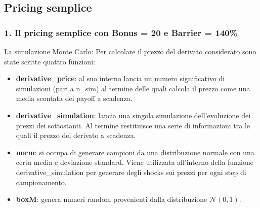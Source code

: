 \subsection[Pricing semplice]{Pricing semplice}
\begin{frame}
	\frametitle{1. Il pricing semplice con Bonus = 20 e Barrier = 140\%}

	\begin{block}{La simulazione Monte Carlo:}
		Per calcolare il prezzo del derivato considerato sono state scritte quattro funzioni:
		\begin{itemize}
			\item \textbf{derivative\_price}: al suo interno lancia un numero significativo di simulazioni (pari a n\_sim) al termine delle quali calcola il prezzo come una media scontata dei payoff a scadenza. 
			\item \textbf{derivative\_simulation}: lancia una singola simulazione dell'evoluzione dei prezzi dei sottostanti. Al termine restituisce una serie di informazioni tra le quali il prezzo del derivato a scadenza.
			\item \textbf{norm}: si occupa di generare campioni da una distribuzione normale con una certa media e deviazione standard. Viene utilizzata all'interno della funzione derivative\_simulation per generare degli shocks sui prezzi per ogni step di campionamento. 
			\item \textbf{boxM}: genera numeri random provenienti dalla distribuzione $\mathcal{N}(0, 1)$.
		\end{itemize}
	\end{block}

\end{frame}



